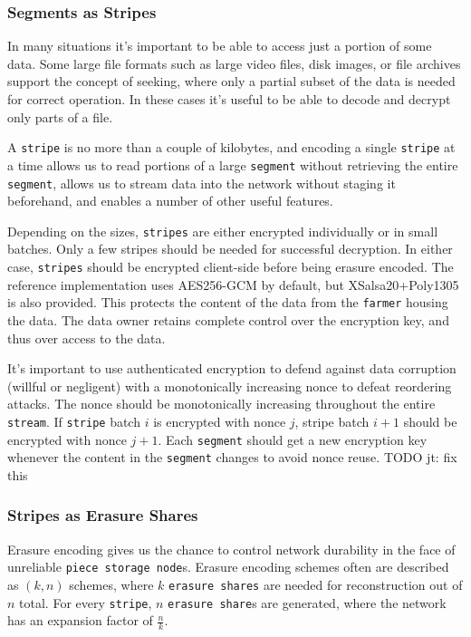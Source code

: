 \documentclass[a4paper,10pt]{article} \usepackage[utf8]{inputenc}
\newcommand{\x}[1]{{\tt #1}} \newcommand{\code}[1]{{\tt #1}}
\newcommand{\todo}[1]{{\color{red} TODO #1 }}
\begin{document}
\subsubsection{Segments as Stripes}

In many situations it's important to be able to access just a portion of some
data. Some large file formats such as large video files, disk images, or file
archives support the concept of seeking, where only a partial subset of the data
is needed for correct operation. In these cases it's useful to be able to decode
and decrypt only parts of a file.

A \x{stripe} is no more than a couple of kilobytes, and encoding a single
\x{stripe} at a time allows us to read portions of a large \x{segment}
without retrieving the entire \x{segment}, allows us to stream data into the
network without staging it beforehand, and enables a number of other useful
features.

Depending on the sizes, \x{stripes} are either encrypted individually or in
small batches. Only a few stripes should be needed for successful
decryption. In either case, \x{stripes} should be encrypted client-side before
being erasure encoded. The reference implementation uses AES256-GCM by default,
but XSalsa20+Poly1305 is also provided. This protects the
content of the data from the \x{farmer} housing the data. The data owner
retains complete control over the encryption key, and thus over access to the
data.

It's important to use authenticated encryption to defend against data corruption
(willful or negligent) with a monotonically increasing nonce to defeat
reordering attacks. The nonce should be monotonically increasing throughout
the entire \x{stream}. If \x{stripe} batch $i$ is encrypted
with nonce $j$, stripe batch $i+1$ should be encrypted with nonce $j+1$. Each
\x{segment} should get a new encryption key whenever the content in the
\x{segment} changes to avoid nonce reuse. \todo{jt: fix this}

\subsubsection{Stripes as Erasure Shares}

Erasure encoding gives us the chance to control network durability in the face
of unreliable \x{piece storage node}s. Erasure encoding schemes often are
described as $(k, n)$ schemes, where $k$ \x{erasure shares} are needed for
reconstruction out of $n$ total. For every \x{stripe}, $n$ \x{erasure share}s
are generated, where the network has an expansion factor of $\frac{n}{k}$.
\end{document}
